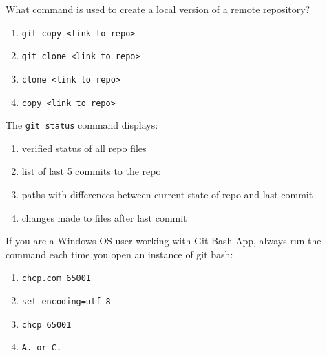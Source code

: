 \documentclass[12pt,fleqn]{examtst}
\begin{document}

\renewcommand{\labelenumi}{\Alph{enumi}.}


\noindent
\begin{minipage}{\textwidth}

What command is used to create a local version of a remote repository?

\begin{enumerate}
    \item \lstinline{git copy <link to repo>}
    \item \lstinline{git clone <link to repo>}
    \item \lstinline{clone <link to repo>}
    \item \lstinline{copy <link to repo>}
\end{enumerate}
\rule{0cm}{1cm}

The \lstinline{git status} command displays:

\begin{enumerate}
    \item verified status of all repo files
    \item list of last 5 commits to the repo
    \item paths with differences between current state of repo and last commit
    \item changes made to files after last commit
\end{enumerate}
\rule{0cm}{1cm}

If you are a Windows OS user working with Git Bash App, always run the command each time you open an instance of git bash:

\begin{enumerate}
    \item \lstinline{chcp.com 65001} 
    \item \lstinline{set encoding=utf-8}
    \item \lstinline{chcp 65001}
    \item \lstinline{A. or C.}
\end{enumerate}
\rule{0cm}{1cm}

\end{minipage}

\end{document}
